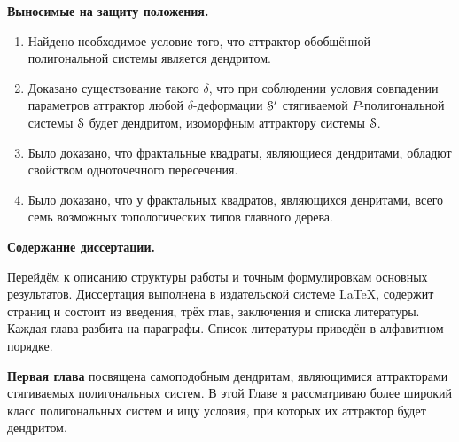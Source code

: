 \begin{center}
\textbf{Выносимые на защиту положения.}
\end{center}

\begin{enumerate}
\item Найдено необходимое условие того, что аттрактор обобщённой полигональной системы является дендритом.

\item Доказано существование такого $\delta$, что при соблюдении условия совпадении параметров аттрактор любой $\delta$-деформации ${\EuScript S}'$ стягиваемой $P$-полигональной системы ${\EuScript S}$ будет дендритом, изоморфным аттрактору системы ${\EuScript S}$.


\item Было доказано, что фрактальные квадраты, являющиеся дендритами, обладют свойством одноточечного пересечения.

\item Было доказано, что у фрактальных квадратов, являющихся денритами, всего семь возможных топологических типов главного дерева.
\end{enumerate}

\begin{center}
    \textbf{Содержание диссертации.}
\end{center}

Перейдём к описанию структуры работы и точным формулировкам основных результатов.
Диссертация выполнена в издательской системе \LaTeX, содержит  страниц и состоит из введения, трёх глав, заключения и списка литературы.
Каждая глава разбита на параграфы.
Список литературы приведён в алфавитном порядке.


\textbf{Первая глава} посвящена самоподобным дендритам, являющимися аттракторами стягиваемых полигональных систем.
В этой Главе я рассматриваю более широкий класс полигональных систем и ищу условия, при которых их аттрактор будет дендритом. 

